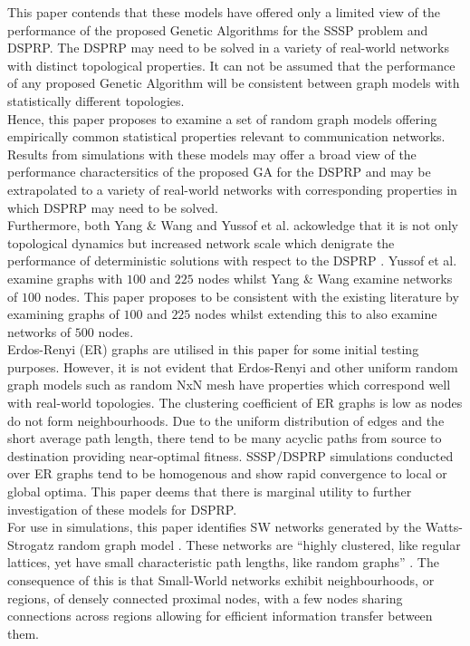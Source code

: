 \documentclass[
	a4paper, %
	10pt, %
	unnumberedsections, %
	twoside, %
]{LTJournalArticle}
\begin{document}
This paper contends that these models have  offered only a limited view of the performance of the proposed Genetic Algorithms for the SSSP problem and DSPRP. The DSPRP may need to be solved in a variety of real-world networks with distinct topological properties. It can not be assumed that the performance of any proposed Genetic Algorithm will be consistent between graph models with statistically different topologies.  \\ 

Hence, this paper proposes to examine a set of random graph models offering empirically common statistical properties relevant to communication networks. Results from simulations with these models may offer a broad view of the performance charactersitics of the proposed GA for the DSPRP and may be extrapolated to a variety of real-world networks with corresponding properties in which DSPRP may need to be solved. \\

Furthermore, both Yang \& Wang and Yussof et al. ackowledge that it is not only topological dynamics but increased network scale which denigrate the performance of deterministic solutions with respect to the DSPRP \cite{yang:10} \cite{yussof:09}. Yussof et al. examine graphs with \(100\) and \(225\) nodes whilst Yang \& Wang examine networks of \(100\) nodes. This paper proposes to be consistent with the existing literature by examining graphs of \(100\) and \(225\) nodes whilst extending this to also examine networks of \(500\) nodes. \\

Erdos-Renyi (ER) graphs are utilised in this paper for some initial testing purposes. However, it is not evident that Erdos-Renyi and other uniform random graph models such as random NxN mesh have properties which correspond well with real-world topologies. The clustering coefficient of ER graphs is low as nodes do not form neighbourhoods. Due to the uniform distribution of edges and the short average path length, there tend to be many acyclic paths from source to destination providing near-optimal fitness. SSSP/DSPRP simulations conducted over ER graphs tend to be homogenous and show rapid convergence to local or global optima. This paper deems that there is marginal utility to further investigation of these models for DSPRP. \\

For use in simulations, this paper identifies SW networks generated by the Watts-Strogatz random graph model \cite{watts:98}. These networks are ``highly clustered, like regular lattices, yet have small characteristic path lengths, like random graphs'' \cite{watts:98}. The consequence of this is that Small-World networks exhibit neighbourhoods, or regions, of densely connected proximal nodes, with a few nodes sharing connections across regions allowing for efficient information transfer between them. \\
\end{document}

